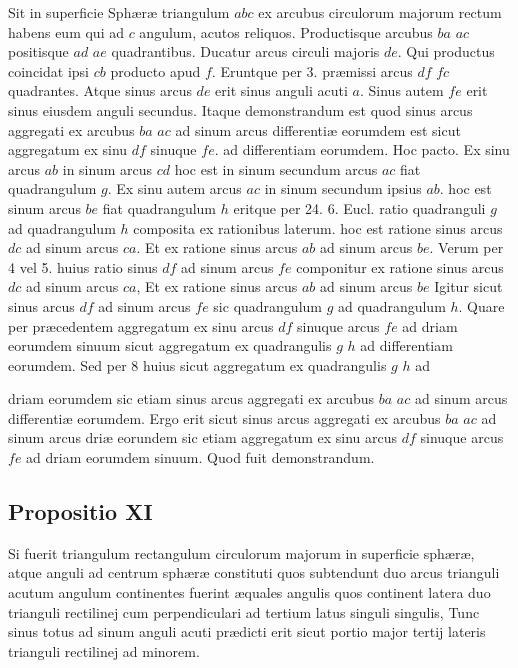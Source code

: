 \documentclass[11pt,a4paper]{article}
\begin{document}
Sit in superficie Sphæræ triangulum $abc$ ex arcubus circulorum majorum rectum habens eum qui ad $c$ angulum, acutos reliquos. Productisque arcubus $ba$ $ac$ positisque $ad$ $ae$ quadrantibus. Ducatur arcus circuli majoris $de$. Qui productus coincidat ipsi $cb$ producto apud $f$. Eruntque per 3. præmissi arcus $df$ $fc$ quadrantes. Atque sinus arcus $de$ erit sinus anguli acuti $a$. Sinus autem $fe$ erit sinus eiusdem anguli secundus. Itaque demonstrandum est quod sinus arcus aggregati ex arcubus $ba$ $ac$ ad sinum arcus differentiæ eorumdem est sicut aggregatum ex sinu $df$ sinuque $fe$. ad differentiam eorumdem. Hoc pacto. Ex sinu arcus $ab$ in sinum arcus $cd$ hoc est in sinum secundum arcus $ac$ fiat quadrangulum $g$. Ex sinu autem arcus $ac$ in sinum secundum ipsius $ab$. hoc est sinum arcus $be$ fiat quadrangulum $h$ eritque per 24. 6. Eucl. ratio quadranguli $g$ ad quadrangulum $h$ composita ex rationibus laterum. hoc est ratione sinus arcus $dc$ ad sinum arcus $ca$. Et ex ratione sinus arcus $ab$ ad sinum arcus $be$. Verum per 4 vel 5. huius ratio sinus $df$ ad sinum arcus $fe$ componitur ex ratione sinus arcus $dc$ ad sinum arcus $ca$, Et ex ratione sinus arcus $ab$ ad sinum arcus $be$ Igitur sicut sinus arcus $df$ ad sinum arcus $fe$ sic quadrangulum $g$ ad quadrangulum $h$. Quare per præcedentem aggregatum ex sinu arcus $df$ sinuque arcus $fe$ ad driam eorumdem sinuum sicut aggregatum ex quadrangulis $g$ $h$ ad differentiam eorumdem. Sed per 8 huius sicut aggregatum ex quadrangulis $g$ $h$ ad

driam eorumdem sic etiam sinus arcus aggregati ex arcubus $ba$ $ac$ ad sinum arcus differentiæ eorumdem. Ergo erit sicut sinus arcus aggregati ex arcubus $ba$ $ac$ ad sinum arcus driæ eorundem sic etiam aggregatum ex sinu arcus $df$ sinuque arcus $fe$ ad driam eorumdem sinuum. Quod fuit demonstrandum.

\subsection*{Propositio XI}

Si fuerit triangulum rectangulum circulorum majorum in superficie sphæræ, atque anguli ad centrum sphæræ constituti quos subtendunt duo arcus trianguli acutum angulum continentes fuerint æquales angulis quos continent latera duo trianguli rectilinej cum perpendiculari ad tertium latus singuli singulis, Tunc sinus totus ad sinum anguli acuti prædicti erit sicut portio major tertij lateris trianguli rectilinej ad minorem.
\end{document}
